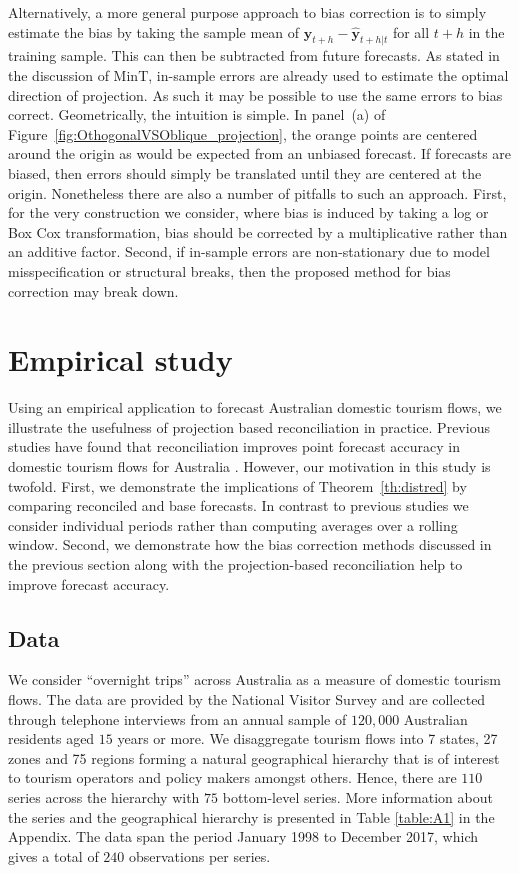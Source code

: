 \documentclass[12pt]{article}
\theoremstyle{definition}
\begin{document}
Alternatively, a more general purpose approach to bias correction is to simply estimate the bias by taking the sample mean of $\bm{y}_{t+h}-\hat{\bm{y}}_{t+h|t}$ for all $t+h$ in the training sample. This can then be subtracted from future forecasts. As stated in the discussion of MinT, in-sample errors are already used to estimate the optimal direction of projection. As such it may be possible to use the same errors to bias correct. Geometrically, the intuition is simple. In panel~(a) of Figure~\ref{fig:OthogonalVSOblique_projection}, the orange points are centered around the origin as would be expected from an unbiased forecast. If forecasts are biased, then errors should simply be translated until they are centered at the origin. Nonetheless there are also a number of pitfalls to such an approach. First, for the very construction we consider, where bias is induced by taking a log or Box Cox transformation, bias should be corrected by a multiplicative rather than an additive factor. Second, if in-sample errors are non-stationary due to model misspecification or structural breaks, then the proposed method for bias correction may break down.

\section{Empirical study} \label{sec:EmpStudy}

	Using an empirical application to forecast Australian domestic tourism flows, we illustrate the usefulness of projection based reconciliation in practice. Previous studies have found that reconciliation improves point forecast accuracy in domestic tourism flows for Australia \citep[see for example][]{Athanasopoulos2009, Hyndman2011,WicEtAl2019}. However, our motivation in this study is twofold.  First, we demonstrate the implications of Theorem~\ref{th:distred} by comparing reconciled and base forecasts. In contrast to previous studies we consider individual periods rather than computing averages over a rolling window.  Second, we demonstrate how the bias correction methods discussed in the previous section along with the projection-based reconciliation help to improve forecast accuracy.
	
	
	\subsection{Data}
	
	We consider ``overnight trips'' across Australia as a measure of domestic tourism flows. The data are provided by the National Visitor Survey and are collected through telephone interviews from an annual sample of $120,000$ Australian residents aged $15$ years or more. We disaggregate tourism flows into 7 states, 27 zones and 75 regions forming a natural geographical hierarchy that is of interest to tourism operators and policy makers amongst others. Hence, there are $110$ series across the hierarchy with $75$ bottom-level series. More information about the series and the geographical hierarchy is presented in Table \ref{table:A1} in the Appendix. The data span the period January 1998 to December 2017, which gives a total of $240$ observations per series.
\end{document}
